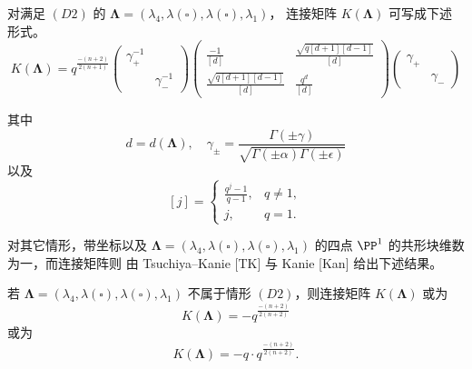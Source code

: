 \begin{theorem}[6.25]
对满足 $(D2)$ 的 $\mathbf{\Lambda}=(\lambda_4,\lambda(\square),\lambda(\square),\lambda_1)$，
连接矩阵 $K(\mathbf{\Lambda})$ 可写成下述形式。
\[
K(\mathbf{\Lambda})=q^{\frac{-(n+2)}{2(n+1)}}
\begin{pmatrix}
\gamma_+^{-1} & \\[2pt]
 & \gamma_-^{-1}
\end{pmatrix}
\begin{pmatrix}
\displaystyle\frac{-1}{[d]} &
\displaystyle\frac{\sqrt{q[d+1][d-1]}}{[d]}\\[10pt]
\displaystyle\frac{\sqrt{q[d+1][d-1]}}{[d]} &
\displaystyle\frac{q^d}{[d]}
\end{pmatrix}
\begin{pmatrix}
\gamma_+ & \\[2pt]
 & \gamma_-
\end{pmatrix}
\]
\end{theorem}

其中
\[
d=d(\mathbf{\Lambda}),\quad
\gamma_\pm=\frac{\Gamma(\pm\gamma)}
{\sqrt{\Gamma(\pm\alpha)\Gamma(\pm\epsilon)}}
\]
以及
\[
[j]=
\begin{cases}
\displaystyle\frac{q^j-1}{q-1}, & q\neq1,\\[10pt]
j, & q=1.
\end{cases}
\]

对其它情形，带坐标以及 $\mathbf{\Lambda}=(\lambda_4,\lambda(\square),
\lambda(\square),\lambda_1)$ 的四点 $\PP^1$ 的共形块维数为一，而连接矩阵则
由 Tsuchiya–Kanie [TK] 与 Kanie [Kan] 给出下述结果。

\begin{theorem}[6.26]
若 $\mathbf{\Lambda}=(\lambda_4,\lambda(\square),\lambda(\square),\lambda_1)$
不属于情形 $(D2)$，则连接矩阵 $K(\mathbf{\Lambda})$ 或为
\[
K(\mathbf{\Lambda})=-q^{\frac{-(n+2)}{2(n+2)}}
\]
或为
\[
K(\mathbf{\Lambda})=-q\cdot q^{\frac{-(n+2)}{2(n+2)}}.
\]
\end{theorem}

